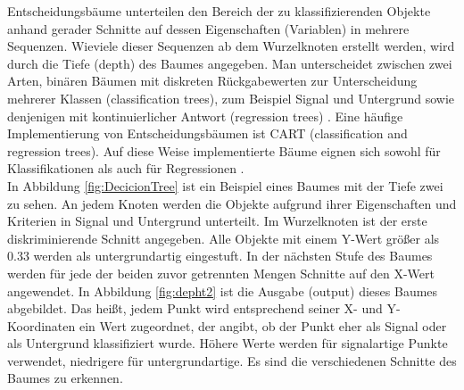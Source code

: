 Entscheidungsb\"aume unterteilen den Bereich der zu klassifizierenden Objekte anhand gerader Schnitte auf dessen Eigenschaften (Variablen) in mehrere Sequenzen. Wieviele dieser Sequenzen ab dem Wurzelknoten erstellt werden, wird durch die Tiefe (depth) des Baumes angegeben. Man unterscheidet zwischen zwei Arten, bin\"aren B\"aumen mit diskreten R\"uckgabewerten zur Unterscheidung mehrerer Klassen (classification trees), zum Beispiel Signal und Untergrund sowie denjenigen mit kontinuierlicher Antwort (regression trees) \cite{SWB-455193959}. Eine h\"aufige Implementierung von Entscheidungsb\"aumen ist CART (classification and regression trees). Auf diese Weise implementierte B\"aume eignen sich sowohl f\"ur Klassifikationen als auch f\"ur Regressionen \cite{CART}.\\
In Abbildung \ref{fig:DecicionTree} ist ein Beispiel eines Baumes mit der Tiefe zwei zu sehen. An jedem Knoten werden die Objekte aufgrund ihrer Eigenschaften und Kriterien in Signal und Untergrund unterteilt. Im Wurzelknoten ist der erste diskriminierende Schnitt angegeben. Alle Objekte mit einem Y-Wert gr\"o\ss er als 0.33 werden als untergrundartig eingestuft. In der n\"achsten Stufe des Baumes werden f\"ur jede der beiden zuvor getrennten Mengen Schnitte auf den X-Wert angewendet. In Abbildung \ref{fig:depht2} ist die Ausgabe (output) dieses Baumes abgebildet. Das hei\ss t, jedem Punkt wird entsprechend seiner X- und Y-Koordinaten ein Wert zugeordnet, der angibt, ob der Punkt eher als Signal oder als Untergrund klassifiziert wurde. H\"ohere Werte werden f\"ur signalartige Punkte verwendet, niedrigere f\"ur untergrundartige. Es sind die verschiedenen Schnitte des Baumes zu erkennen.\\

